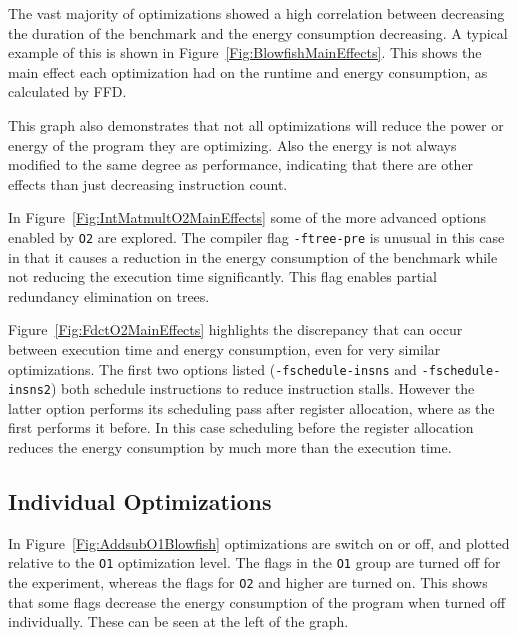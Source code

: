 \documentclass[twocolumn]{article}
\newcommand{\todo}[1]{\textbf{\textcolor{red}{#1}}}
\begin{document}
The vast majority of optimizations showed a high correlation between decreasing the duration of the benchmark and the energy consumption decreasing. A typical example of this is shown in Figure~\ref{Fig:BlowfishMainEffects}. This shows the main effect each optimization had on the runtime and energy consumption, as calculated by FFD.

This graph also demonstrates that not all optimizations will reduce the power or energy of the program they are optimizing. Also the energy is not always modified to the same degree as performance, indicating that there are other effects than just decreasing instruction count.

In Figure~\ref{Fig:IntMatmultO2MainEffects} some of the more advanced options enabled by \texttt{O2} are explored. The compiler flag \texttt{-ftree-pre} is unusual in this case in that it causes a reduction in the energy consumption of the benchmark while not reducing the execution time significantly. This flag enables partial redundancy elimination on trees.

Figure~\ref{Fig:FdctO2MainEffects} highlights the discrepancy that can occur between execution time and energy consumption, even for very similar optimizations. The first two options listed (\texttt{-fschedule-insns} and \texttt{-fschedule-insns2}) both schedule instructions to reduce instruction stalls. However the latter option performs its scheduling pass after register allocation, where as the first performs it before. In this case scheduling before the register allocation reduces the energy consumption by much more than the execution time.


\subsection{Individual Optimizations}

In Figure~\ref{Fig:AddsubO1Blowfish} optimizations are switch on or off, and plotted relative to the \texttt{O1} optimization level. The flags in the \texttt{O1} group are turned off for the experiment, whereas the flags for \texttt{O2} and higher are turned on. This shows that some flags decrease the energy consumption of the program when turned off individually. These can be seen at the left of the graph.
\end{document}
